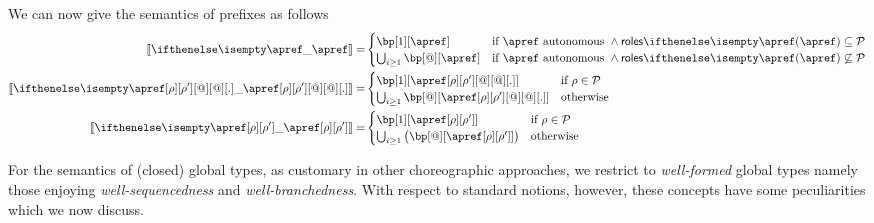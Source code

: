 We can now give the semantics of prefixes as follows
\begin{align*}
  \ksem{\apref} =
  &
    \begin{cases}
      \bp[1][\apref]
      & \text{if $\apref$ autonomous } \land \roles{\apref} \subseteq \participants
      \\
      \bigcup_{i \geq 1}\bp[@][\apref]
      & \text{if $\apref$ autonomous } \land \roles{\apref} \not\subseteq \participants
    \end{cases}
  \\
  \ksem{\apref[\arole][\arole'][@][@][.]} =
  &
    \begin{cases}
      \bp[1][{\apref[\arole][\arole'][@][@][.]}]
      & \text{if } \arole \in \participants
      \\
      \bigcup_{i \geq 1}\bp[@][{\apref[\arole][\arole'][@][@][.]}]
      & \text{otherwise}
    \end{cases}
  \\
  \ksem{\apref[\arole][\arole']} =
  &
    \begin{cases}
      \bp[1][{\apref[\arole][\arole']}]
      & \text{if } \arole \in \participants
      \\
      \bigcup_{i \geq 1}\big(\bp[@][{\apref[\arole][\arole']}]\big)
      & \text{otherwise}
    \end{cases}
\end{align*}

For the semantics of (closed) global types, as customary in other
choreographic approaches, we restrict to \emph{well-formed} global
types namely those enjoying \emph{well-sequencedness} and
\emph{well-branchedness}.
%
With respect to standard notions, however, these concepts have some
peculiarities which we now discuss.

